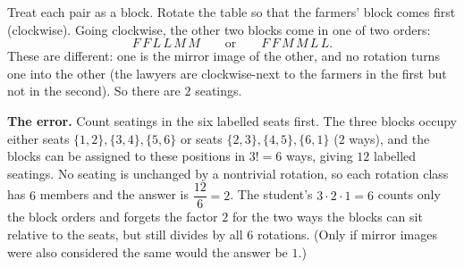 Treat each pair as a block. Rotate the table so that the farmers' block comes first (clockwise). Going clockwise, the other two blocks come in one of two orders:
\[F\,F\,L\,L\,M\,M\qquad\text{or}\qquad F\,F\,M\,M\,L\,L .\]
These are different: one is the mirror image of the other, and no rotation turns one into the other (the lawyers are clockwise-next to the farmers in the first but not in the second). So there are $\boxed{2}$ seatings.

\textbf{The error.} Count seatings in the six labelled seats first. The three blocks occupy either seats $\{1,2\},\{3,4\},\{5,6\}$ or seats $\{2,3\},\{4,5\},\{6,1\}$ ($2$ ways), and the blocks can be assigned to these positions in $3!=6$ ways, giving $12$ labelled seatings. No seating is unchanged by a nontrivial rotation, so each rotation class has $6$ members and the answer is $\dfrac{12}{6}=2$. The student's $3\cdot2\cdot1=6$ counts only the block orders and forgets the factor $2$ for the two ways the blocks can sit relative to the seats, but still divides by all $6$ rotations. (Only if mirror images were also considered the same would the answer be $1$.)
